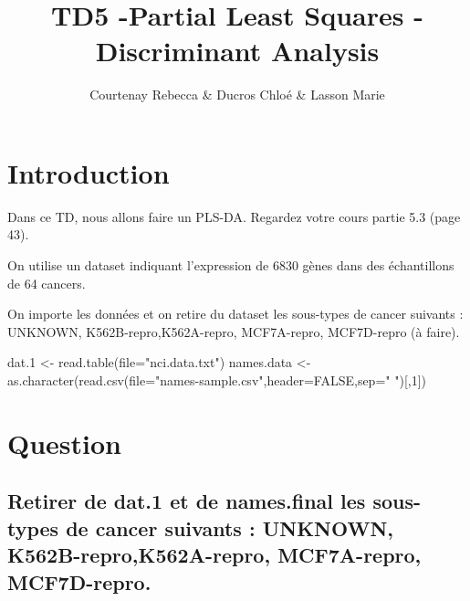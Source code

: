 \documentclass[
]{article}
\title{TD5 -Partial Least Squares - Discriminant Analysis}
\author{Courtenay Rebecca \& Ducros Chloé \& Lasson Marie}
\date{}
\newenvironment{Shaded}{\begin{snugshade}}{\end{snugshade}}
\newcommand{\AttributeTok}[1]{\textcolor[rgb]{0.77,0.63,0.00}{#1}}
\newcommand{\ConstantTok}[1]{\textcolor[rgb]{0.00,0.00,0.00}{#1}}
\newcommand{\DecValTok}[1]{\textcolor[rgb]{0.00,0.00,0.81}{#1}}
\newcommand{\FloatTok}[1]{\textcolor[rgb]{0.00,0.00,0.81}{#1}}
\newcommand{\FunctionTok}[1]{\textcolor[rgb]{0.00,0.00,0.00}{#1}}
\newcommand{\NormalTok}[1]{#1}
\newcommand{\OtherTok}[1]{\textcolor[rgb]{0.56,0.35,0.01}{#1}}
\newcommand{\StringTok}[1]{\textcolor[rgb]{0.31,0.60,0.02}{#1}}
\begin{document}
\maketitle

{
\setcounter{tocdepth}{2}
\tableofcontents
}
\hypertarget{introduction}{%
\section{Introduction}\label{introduction}}

Dans ce TD, nous allons faire un PLS-DA. Regardez votre cours partie 5.3
(page 43).

On utilise un dataset indiquant l'expression de 6830 gènes dans des
échantillons de 64 cancers.

On importe les données et on retire du dataset les sous-types de cancer
suivants : UNKNOWN, K562B-repro,K562A-repro, MCF7A-repro, MCF7D-repro (à
faire).

\begin{Shaded}
\begin{Highlighting}[]
\NormalTok{dat}\FloatTok{.1} \OtherTok{\textless{}{-}} \FunctionTok{read.table}\NormalTok{(}\AttributeTok{file=}\StringTok{"nci.data.txt"}\NormalTok{)}
\NormalTok{names.data }\OtherTok{\textless{}{-}} \FunctionTok{as.character}\NormalTok{(}\FunctionTok{read.csv}\NormalTok{(}\AttributeTok{file=}\StringTok{"names{-}sample.csv"}\NormalTok{,}\AttributeTok{header=}\ConstantTok{FALSE}\NormalTok{,}\AttributeTok{sep=}\StringTok{" "}\NormalTok{)[,}\DecValTok{1}\NormalTok{])}
\end{Highlighting}
\end{Shaded}

\hypertarget{question}{%
\section{Question}\label{question}}

\hypertarget{retirer-de-dat.1-et-de-names.final-les-sous-types-de-cancer-suivants-unknown-k562b-reprok562a-repro-mcf7a-repro-mcf7d-repro.}{%
\subsection{Retirer de dat.1 et de names.final les sous-types de cancer
suivants : UNKNOWN, K562B-repro,K562A-repro, MCF7A-repro,
MCF7D-repro.}\label{retirer-de-dat.1-et-de-names.final-les-sous-types-de-cancer-suivants-unknown-k562b-reprok562a-repro-mcf7a-repro-mcf7d-repro.}}
\end{document}
